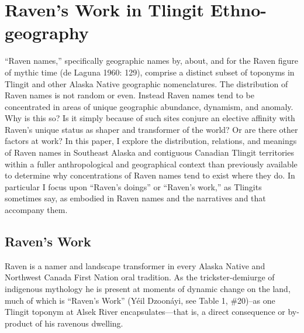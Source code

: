 \chapter[Raven’s Work in Tlingit Ethno-geography]{\vspace{-25pt}Raven’s Work in Tlingit Ethno-geography}






\def\authorlast{Thornton}

\renewcommand{\beginchapter}{\pageref{thornton-ch-begin}}
\renewcommand{\finishchapter}{\pageref{thornton-ch-end}}
\label{thornton-ch-begin}



\thispagestyle{firststyle}





“Raven names,” specifically geographic names by, about, and for the Raven figure of mythic time (de Laguna 1960: 129), comprise a distinct subset of toponyms in Tlingit and other Alaska Native geographic nomenclatures.  The distribution of Raven names is not random or even. Instead Raven names tend to be concentrated in areas of unique geographic abundance, dynamism, and anomaly.  Why is this so? Is it simply because of such sites conjure an elective affinity with Raven’s unique status as shaper and transformer of the world?  Or are there other factors at work?  In this paper, I explore the distribution, relations, and meanings of Raven names in Southeast Alaska and contiguous Canadian Tlingit territories within a fuller anthropological and geographical context than previously available to determine why concentrations of Raven names tend to exist where they do.  In particular I focus upon “Raven’s doings” or “Raven’s work,” as Tlingits sometimes say, as embodied in Raven names and the narratives and that accompany them.

\section{Raven’s Work}
Raven is a namer and landscape transformer in every Alaska Native and Northwest Canada First Nation oral tradition.  As the trickster-demiurge of indigenous mythology he is present at moments of dynamic change on the land, much of which is “Raven’s Work” (Yéil Dzoonáyi, see Table 1, \#20)--as one Tlingit toponym at Alsek River encapsulates—that is, a direct consequence or by-product of his ravenous dwelling.

